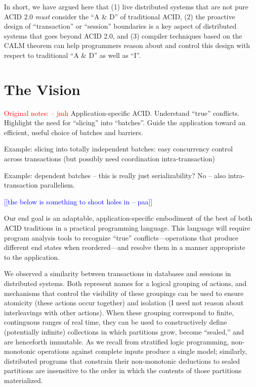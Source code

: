 \documentclass{sig-alternate}
\newcommand{\jmh}[1]{{\textcolor{red}{#1 -- jmh}}}
\newcommand{\paa}[1]{{\textcolor{blue}{[[#1 -- paa]]}}}
\begin{document}
In short, we have argued here that (1) live distributed systems that are not pure ACID 2.0 \emph{must} consider the ``A \& D'' of traditional ACID, (2) the proactive design of ``transaction'' or ``session'' boundaries is a key aspect of distributed systems that goes beyond ACID 2.0, and (3) compiler techniques based on the CALM theorem can help programmers reason about and control this design with respect to traditional ``A \& D'' as well as ``I''.

\section{The Vision}



\jmh{Original notes:}  
Application-specific ACID.  Understand ``true'' conflicts.  Highlight the need
for ``slicing'' into ``batches''.  Guide the application toward an efficient,
useful choice of batches and barriers.

Example: slicing into totally independent batches: easy concurrency control
across transactions (but possibly need coordination intra-transaction)

Example: dependent batches -- this is really just serializability?  No -- also
intra-transaction parallelism.

\paa{the below is something to shoot holes in}

Our end goal is an adaptable, application-specific embodiment of the best of both ACID traditions in a practical programming language. This language will require program analysis tools to recognize ``true'' conflicts---operations that produce different end states when reordered---and resolve them in a manner appropriate to the application.

We observed a similarity between transactions in databases and sessions in distributed systems.  Both represent names for a logical grouping of actions, and mechanisms that control the visibility of these groupings can be used to ensure atomicity (these actions occur together) and isolation (I need not reason about interleavings with other actions).  When these grouping correspond to finite, continguous ranges of real time, they can be used to constructively define (potentially infinite) collections in which partitions grow, become ``sealed,'' and are henceforth immutable.  As we recall from stratified logic programming, non-monotonic operations against complete inputs produce a single model; similarly, distributed programs that constrain their non-monotonic deductions to sealed partitions are insensitive to the order in which the contents of those partitions materialized.
 
\end{document}
